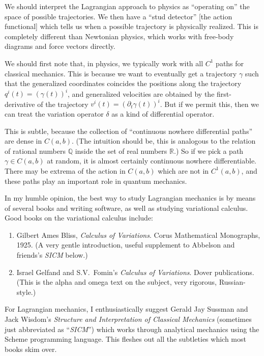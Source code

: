 We should interpret the Lagrangian approach to physics as ``operating
on'' the space of possible trajectories. We then have a ``stud detector''
[the action functional] which tells us when a possible trajectory is
physically realized. This is completely different than Newtonian
physics, which works with free-body diagrams and force vectors directly.

We should first note that, in physics, we typically work with all
$C^{1}$ paths for classical mechanics. This is because we want to
eventually get a trajectory $\gamma$ such that the generalized
coordinates coincides the positions along the trajectory
$q^{i}(t)=(\gamma(t))^{i}$, and generalized velocities are obtained by
the first-derivative of the trajectory $v^{i}(t)=(\partial_{t}\gamma(t))^{i}$.
But if we permit this, then we can treat the variation operator $\delta$
as a kind of differential operator.

This is subtle, because the collection of ``continuous nowhere
differential paths'' are dense in $C(a,b)$. (The intuition should be,
this is analogous to the relation of rational numbers $\mathbb{Q}$
inside the set of real numbers $\mathbb{R}$.) So if we pick a path
$\gamma\in C(a,b)$ at random, it is almost certainly continuous nowhere
differentiable. There may be extrema of the action in $C(a,b)$ which are
not in $C^{1}(a,b)$, and these paths play an important role in quantum
mechanics. 

In my humble opinion, the best way to study Lagrangian mechanics is by
means of several books and writing software, as well as studying
variational calculus. Good books on the variational calculus include:
\begin{enumerate}
\item Gilbert Ames Bliss, \emph{Calculus of Variations}. Corus
  Mathematical Monographs, 1925. (A very gentle introduction, useful
  supplement to Abbelson and friends's \emph{SICM} below.)
\item Israel Gelfand and S.V.~Fomin's
  \emph{Calculus of Variations}. Dover publications. (This is the alpha
  and omega text on the subject, very rigorous, Russian-style.)
\end{enumerate}
For Lagrangian mechanics, I enthusiastically suggest
Gerald Jay Sussman and Jack Wisdom's \emph{Structure and Interpretation of Classical Mechanics}
(sometimes just abbreviated as ``\emph{SICM}'')
which works through analytical mechanics using the Scheme programming
language. This fleshes out all the subtleties which most books skim
over.

